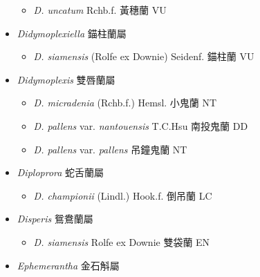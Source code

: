 \begin{itemize}
  \begin{itemize}
        \item[] \textit{D. uncatum} Rchb.f.  黃穗蘭   VU
  \end{itemize}
 \item[] \textit{Didymoplexiella} 錨柱蘭屬
                                
  \begin{itemize}
        \item[] \textit{D. siamensis} (Rolfe ex Downie) Seidenf.  錨柱蘭   VU
  \end{itemize}
 \item[] \textit{Didymoplexis} 雙唇蘭屬
                                
  \begin{itemize}
        \item[] \textit{D. micradenia} (Rchb.f.) Hemsl.  小鬼蘭   NT
        \item[] \textit{D. pallens} var. \textit{nantouensis} T.C.Hsu  南投鬼蘭   DD
        \item[] \textit{D. pallens} var. \textit{pallens}   吊鐘鬼蘭   NT
  \end{itemize}
 \item[] \textit{Diploprora} 蛇舌蘭屬
                                
  \begin{itemize}
        \item[] \textit{D. championii} (Lindl.) Hook.f.  倒吊蘭   LC
  \end{itemize}
 \item[] \textit{Disperis} 鴛鴦蘭屬
                                
  \begin{itemize}
        \item[] \textit{D. siamensis} Rolfe ex Downie  雙袋蘭   EN
  \end{itemize}
 \item[] \textit{Ephemerantha} 金石斛屬
                                

\end{itemize}
